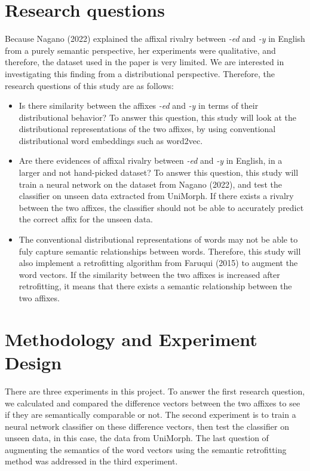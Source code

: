\documentclass[12pt]{article}
\begin{document}
\section{Research questions}
    Because Nagano (2022) explained the affixal rivalry between \emph{-ed} and \emph{-y} in English from a purely semantic perspective, her experiments were qualitative, and therefore, the dataset used in the paper is very limited. We are interested in investigating this finding from a distributional perspective. Therefore, the research questions of this study are as follows:
    \begin{itemize}
        \item Is there similarity between the affixes \emph{-ed} and \emph{-y} in terms of their distributional behavior? To answer this question, this study will look at the distributional representations of the two affixes, by using conventional distributional word embeddings such as word2vec.
        \item Are there evidences of affixal rivalry between \emph{-ed} and \emph{-y} in English, in a larger and not hand-picked dataset? To answer this question, this study will train a neural network on the dataset from Nagano (2022), and test the classifier on unseen data extracted from UniMorph. If there exists a rivalry between the two affixes, the classifier should not be able to accurately predict the correct affix for the unseen data.
        \item The conventional distributional representations of words may not be able to fuly capture semantic relationships between words. Therefore, this study will also implement a retrofitting algorithm from Faruqui (2015) to augment the word vectors. If the similarity between the two affixes is increased after retrofitting, it means that there exists a semantic relationship between the two affixes.
    \end{itemize}

\section{Methodology and Experiment Design}
There are three experiments in this project. To answer the first research question, we calculated and compared the difference vectors between the two affixes to see if they are semantically comparable or not. The second experiment is to train a neural network classifier on these difference vectors, then test the classifier on unseen data, in this case, the data from UniMorph. The last question of augmenting the semantics of the word vectors using the semantic retrofitting method was addressed in the third experiment.
\end{document}
